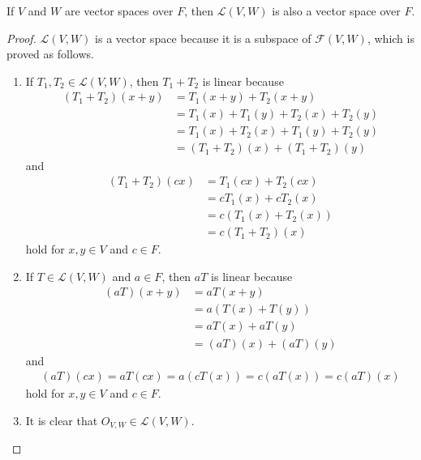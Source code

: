 \begin{theorem}
  If $V$ and $W$ are vector spaces over $F$, then $\mathcal{L}(V, W)$ is also
  a vector space over $F$.
\end{theorem}
\begin{proof}
  $\mathcal{L}(V, W)$ is a vector space because it is a subspace of
  $\mathcal{F}(V, W)$, which is proved as follows.
  \begin{enumerate}
    \item If $T_1, T_2 \in \mathcal{L}(V, W)$, then $T_1 + T_2$ is linear
      because
      \begin{align*}
        (T_1 + T_2)(x + y)
        &= T_1(x + y) + T_2(x + y) \\
        &= T_1(x) + T_1(y) + T_2(x) + T_2(y) \\
        &= T_1(x) + T_2(x) + T_1(y) + T_2(y) \\
        &= (T_1 + T_2)(x) + (T_1 + T_2)(y)
      \end{align*}
      and
      \begin{align*}
        (T_1 + T_2)(cx)
        &= T_1(cx) + T_2(cx) \\
        &= cT_1(x) + cT_2(x) \\
        &= c(T_1(x) + T_2(x)) \\
        &= c(T_1 + T_2)(x)
      \end{align*}
      hold for $x, y \in V$ and $c \in F$.
    \item If $T \in \mathcal{L}(V, W)$ and $a \in F$, then $aT$ is linear
      because
      \begin{align*}
        (aT)(x + y)
        &= aT(x + y) \\
        &= a(T(x) + T(y)) \\
        &= aT(x) + aT(y) \\
        &= (aT)(x) + (aT)(y)
      \end{align*}
      and
      \begin{align*}
        (aT)(cx) = aT(cx) = a(cT(x)) = c(aT(x)) = c(aT)(x)
      \end{align*}
      hold for $x, y \in V$ and $c \in F$.
    \item It is clear that $O_{V, W} \in \mathcal{L}(V, W)$.
      \qedhere
  \end{enumerate}
\end{proof}

